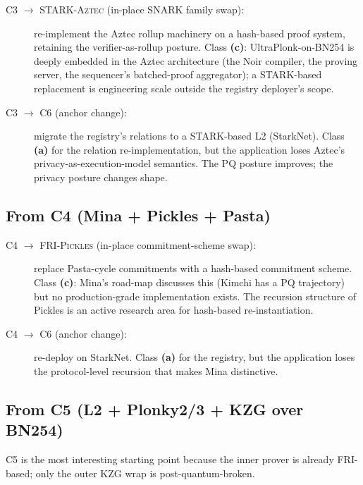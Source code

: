 \begin{description}
  \item[\textsc{C3 $\to$ STARK-Aztec} (in-place SNARK family swap):]
    re-implement the Aztec rollup machinery on a hash-based proof
    system, retaining the verifier-as-rollup posture. Class
    \textbf{(c)}: UltraPlonk-on-BN254 is deeply embedded in the
    Aztec architecture (the Noir compiler, the proving server, the
    sequencer's batched-proof aggregator); a STARK-based replacement
    is engineering scale outside the registry deployer's scope.
  \item[\textsc{C3 $\to$ C6} (anchor change):] migrate the registry's
    relations to a STARK-based L2 (StarkNet). Class \textbf{(a)} for
    the relation re-implementation, but the application loses
    Aztec's privacy-as-execution-model semantics. The PQ posture
    improves; the privacy posture changes shape.
\end{description}

\subsection{From C4 (Mina + Pickles + Pasta)}
\label{sec:mig-c4}

\begin{description}
  \item[\textsc{C4 $\to$ FRI-Pickles} (in-place commitment-scheme
    swap):] replace Pasta-cycle commitments with a hash-based
    commitment scheme. Class \textbf{(c)}: Mina's road-map
    discusses this (Kimchi has a PQ trajectory) but no
    production-grade implementation exists. The recursion structure
    of Pickles is an active research area for hash-based
    re-instantiation.
  \item[\textsc{C4 $\to$ C6} (anchor change):] re-deploy on
    StarkNet. Class \textbf{(a)} for the registry, but the
    application loses the protocol-level recursion that makes Mina
    distinctive.
\end{description}

\subsection{From C5 (L2 + Plonky2/3 + KZG over BN254)}
\label{sec:mig-c5}

C5 is the most interesting starting point because the inner prover is
already FRI-based; only the outer KZG wrap is post-quantum-broken.

